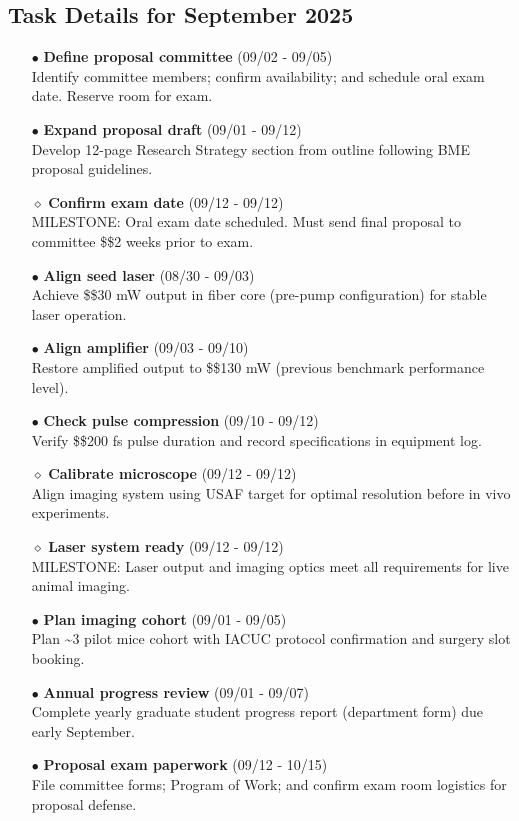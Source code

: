 \documentclass[landscape,a4paper]{article}
\begin{document}
\subsection{Task Details for September 2025}
\begin{itemize}[leftmargin=1cm]
    \item[\textcolor{researchcore}{$\bullet$}] \textbf{Define proposal committee} (09/02 - 09/05)\\ Identify committee members; confirm availability; and schedule oral exam date. Reserve room for exam.
    \item[\textcolor{researchcore}{$\bullet$}] \textbf{Expand proposal draft} (09/01 - 09/12)\\ Develop 12-page Research Strategy section from outline following BME proposal guidelines.
    \item[\textcolor{researchcore}{$\diamond$}] \textbf{Confirm exam date} (09/12 - 09/12)\\ MILESTONE: Oral exam date scheduled. Must send final proposal to committee \$\geq\$2 weeks prior to exam.
    \item[\textcolor{researchexp}{$\bullet$}] \textbf{Align seed laser} (08/30 - 09/03)\\ Achieve \$\geq\$30 mW output in fiber core (pre-pump configuration) for stable laser operation.
    \item[\textcolor{researchexp}{$\bullet$}] \textbf{Align amplifier} (09/03 - 09/10)\\ Restore amplified output to \$\geq\$130 mW (previous benchmark performance level).
    \item[\textcolor{researchexp}{$\bullet$}] \textbf{Check pulse compression} (09/10 - 09/12)\\ Verify \$\leq\$200 fs pulse duration and record specifications in equipment log.
    \item[\textcolor{researchexp}{$\diamond$}] \textbf{Calibrate microscope} (09/12 - 09/12)\\ Align imaging system using USAF target for optimal resolution before in vivo experiments.
    \item[\textcolor{researchexp}{$\diamond$}] \textbf{Laser system ready} (09/12 - 09/12)\\ MILESTONE: Laser output and imaging optics meet all requirements for live animal imaging.
    \item[\textcolor{other}{$\bullet$}] \textbf{Plan imaging cohort} (09/01 - 09/05)\\ Plan \textasciitilde{}3 pilot mice cohort with IACUC protocol confirmation and surgery slot booking.
    \item[\textcolor{other}{$\bullet$}] \textbf{Annual progress review} (09/01 - 09/07)\\ Complete yearly graduate student progress report (department form) due early September.
    \item[\textcolor{other}{$\bullet$}] \textbf{Proposal exam paperwork} (09/12 - 10/15)\\ File committee forms; Program of Work; and confirm exam room logistics for proposal defense.
\end{itemize}
\end{document}
